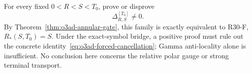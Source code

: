 \begin{openproblem}
\label{open:o3ad-concrete-cancellation}
For every fixed \(0<R<S<T_0\), prove or disprove
\[
 \boxed{\Delta_{R,S}^{[T_0]}\ne0.}
\]
By Theorem~\ref{thm:o3ad-annular-gate}, this family is exactly equivalent to R30-F,
\(R_*(S,T_0)=S\).  Under the exact-symbol bridge, a positive proof must rule out the
concrete identity~\eqref{eq:o3ad-forced-cancellation}; Gamma anti-locality alone is
insufficient.  No conclusion here concerns the relative polar gauge or strong terminal
transport.
\end{openproblem}
